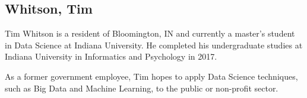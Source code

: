 \subsection{Whitson, Tim}

Tim Whitson is a resident of Bloomington, IN and currently a master's student in 
Data Science at Indiana University. He completed his undergraduate studies 
at Indiana University in Informatics and Psychology in 2017.

As a former government employee, Tim hopes to apply Data Science techniques, such 
as Big Data and Machine Learning, to the public or non-profit sector.
